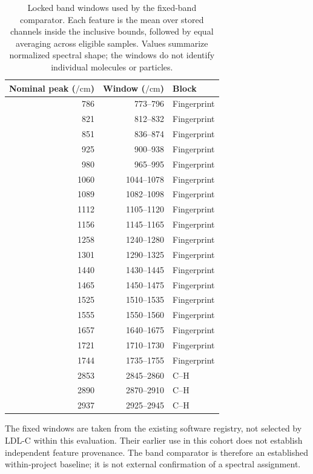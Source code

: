 \documentclass[preprint,12pt]{elsarticle}
\begin{document}
\begin{table}[ht]
\centering
\caption{Locked band windows used by the fixed-band comparator. Each feature is the mean over stored channels inside the inclusive bounds, followed by equal averaging across eligible samples. Values summarize normalized spectral shape; the windows do not identify individual molecules or particles.}
\label{tab:raman_bands}
\small
\begin{tabular}{@{}rrl@{}}
\toprule
Nominal peak ($\si{\per\centi\metre}$) & Window ($\si{\per\centi\metre}$) & Block \\
\midrule
786 & 773--796 & Fingerprint \\
821 & 812--832 & Fingerprint \\
851 & 836--874 & Fingerprint \\
925 & 900--938 & Fingerprint \\
980 & 965--995 & Fingerprint \\
1060 & 1044--1078 & Fingerprint \\
1089 & 1082--1098 & Fingerprint \\
1112 & 1105--1120 & Fingerprint \\
1156 & 1145--1165 & Fingerprint \\
1258 & 1240--1280 & Fingerprint \\
1301 & 1290--1325 & Fingerprint \\
1440 & 1430--1445 & Fingerprint \\
1465 & 1450--1475 & Fingerprint \\
1525 & 1510--1535 & Fingerprint \\
1555 & 1550--1560 & Fingerprint \\
1657 & 1640--1675 & Fingerprint \\
1721 & 1710--1730 & Fingerprint \\
1744 & 1735--1755 & Fingerprint \\
2853 & 2845--2860 & C--H \\
2890 & 2870--2910 & C--H \\
2937 & 2925--2945 & C--H \\
\bottomrule
\end{tabular}
\end{table}

The fixed windows are taken from the existing software registry, not selected by LDL-C within this evaluation. Their earlier use in this cohort does not establish independent feature provenance. The band comparator is therefore an established within-project baseline; it is not external confirmation of a spectral assignment.
\end{document}
